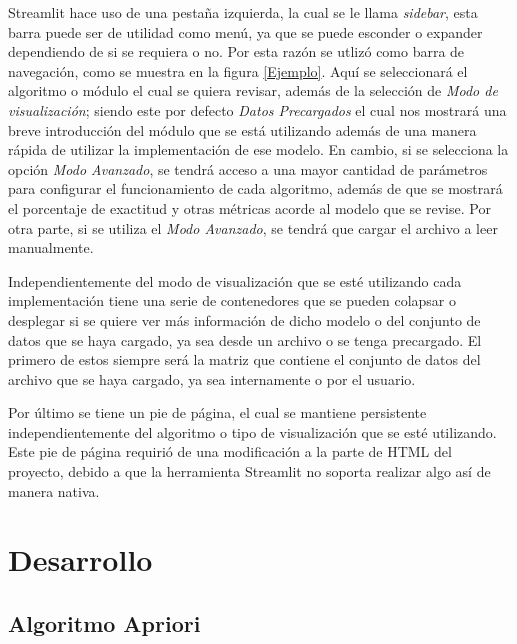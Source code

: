 \documentclass[10pt]{article}
\begin{document}
    Streamlit hace uso de una pestaña izquierda, la cual se le llama \textit{sidebar}, esta barra puede ser de utilidad como menú, ya que se puede esconder o expander dependiendo de si se requiera o no. Por esta razón se utlizó como barra de navegación, como se muestra en la figura \ref{Ejemplo}. Aquí se seleccionará el algoritmo o módulo el cual se quiera revisar, además de la selección de \textit{Modo de visualización}; siendo este por defecto \textit{Datos Precargados} el cual nos mostrará una breve introducción del módulo que se está utilizando además de una manera rápida de utilizar la implementación de ese modelo. En cambio, si se selecciona la opción \textit{Modo Avanzado}, se tendrá acceso a una mayor cantidad de parámetros para configurar el funcionamiento de cada algoritmo, además de que se mostrará el porcentaje de exactitud y otras métricas acorde al modelo que se revise. Por otra parte, si se utiliza el \textit{Modo Avanzado}, se tendrá que cargar el archivo a leer manualmente.\newline
    
    Independientemente del modo de visualización que se esté utilizando cada implementación tiene una serie de contenedores que se pueden colapsar o desplegar si se quiere ver más información de dicho modelo o del conjunto de datos que se haya cargado, ya sea desde un archivo o se tenga precargado. El primero de estos siempre será la matriz que contiene el conjunto de datos del archivo que se haya cargado, ya sea internamente o por el usuario.\newline 
    
    Por último se tiene un pie de página, el cual se mantiene persistente independientemente del algoritmo o tipo de visualización que se esté utilizando. Este pie de página requirió de una modificación a la parte de HTML del proyecto, debido a que la herramienta Streamlit no soporta realizar algo así de manera nativa.

\newpage
\section{Desarrollo}

\subsection{Algoritmo Apriori}
\end{document}
